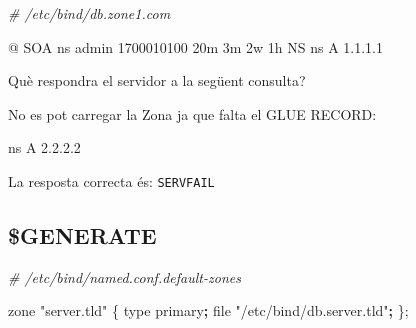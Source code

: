 \documentclass[]{article}
\newenvironment{Shaded}{}{}
\newcommand{\BuiltInTok}[1]{#1}
\newcommand{\CommentTok}[1]{\textcolor[rgb]{0.38,0.63,0.69}{\textit{#1}}}
\newcommand{\ExtensionTok}[1]{#1}
\newcommand{\FunctionTok}[1]{\textcolor[rgb]{0.02,0.16,0.49}{#1}}
\newcommand{\KeywordTok}[1]{\textcolor[rgb]{0.00,0.44,0.13}{\textbf{#1}}}
\newcommand{\NormalTok}[1]{#1}
\newcommand{\StringTok}[1]{\textcolor[rgb]{0.25,0.44,0.63}{#1}}
\newcommand{\VariableTok}[1]{\textcolor[rgb]{0.10,0.09,0.49}{#1}}
\begin{document}
\begin{Shaded}
\begin{Highlighting}[]
\CommentTok{# /etc/bind/db.zone1.com}

\ExtensionTok{@}\NormalTok{   SOA ns  admin   1700010100 20m 3m 2w 1h}
    \ExtensionTok{NS}\NormalTok{  ns}
    \ExtensionTok{A}\NormalTok{   1.1.1.1}
\end{Highlighting}
\end{Shaded}

Què respondra el servidor a la següent consulta?

\begin{Shaded}
\end{Shaded}

No es pot carregar la Zona ja que falta el GLUE RECORD:

ns A 2.2.2.2

La resposta correcta és: \texttt{SERVFAIL}

\hypertarget{generate}{%
\subsection{\texorpdfstring{\textbf{\$GENERATE}}{\$GENERATE}}\label{generate}}

\begin{Shaded}
\begin{Highlighting}[]
\CommentTok{# /etc/bind/named.conf.default-zones}

\ExtensionTok{zone} \StringTok{"server.tld"}\NormalTok{ \{}
    \BuiltInTok{type}\NormalTok{ primary}\KeywordTok{;}
    \FunctionTok{file} \StringTok{"/etc/bind/db.server.tld"}\KeywordTok{;}
\NormalTok{\};}
\end{Highlighting}
\end{Shaded}

\begin{Shaded}
\end{Shaded}
\end{document}
